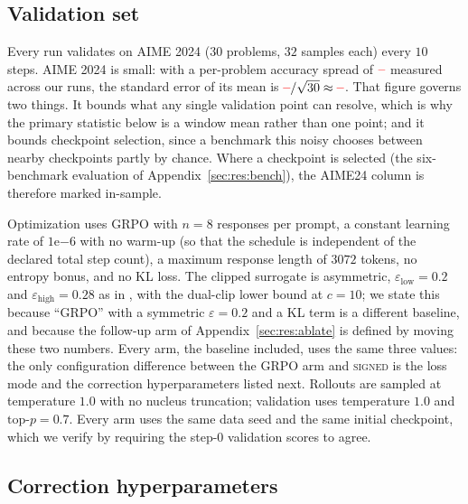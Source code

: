 \documentclass[11pt]{article}
\providecommand{\PENDING}{\textcolor{red}{\textbf{--}}}
\newcommand{\num}[1]{\ifcsname #1\endcsname\csname #1\endcsname\else\PENDING\fi}
\begin{document}
\subsection{Validation set}
\label{sec:valset}

Every run validates on AIME 2024 ($30$ problems, $32$ samples each) every $10$ steps.
AIME 2024 is small: with a per-problem accuracy spread of $\num{STDaime}$ measured
across our runs, the standard error of its mean is
$\num{STDaime}/\sqrt{30} \approx \num{SEaime}$. That figure governs two things.
It bounds what any single validation point can resolve, which is why the primary
statistic below is a window mean rather than one point; and it bounds checkpoint
selection, since a benchmark this noisy chooses between nearby checkpoints partly by
chance. Where a checkpoint is selected (the six-benchmark evaluation of
Appendix~\ref{sec:res:bench}), the AIME24 column is therefore marked in-sample.

Optimization uses GRPO \citep{shao2024deepseekmath} with $n = 8$ responses per prompt, a constant learning rate
of $1\mathrm{e}{-6}$ with no warm-up (so that the schedule is independent of the
declared total step count), a maximum response length of $3072$ tokens, no entropy
bonus, and no KL loss. The clipped surrogate \citep{schulman2017proximal} is
asymmetric, $\varepsilon_{\mathrm{low}} = 0.2$ and
$\varepsilon_{\mathrm{high}} = 0.28$ as in \citet{yu2025dapo}, with
the dual-clip lower bound at $c = 10$; we state this because ``GRPO'' with a
symmetric $\varepsilon = 0.2$ and a KL term is a different baseline, and because
the follow-up arm of Appendix~\ref{sec:res:ablate} is defined by moving these two
numbers. Every arm, the baseline included, uses the same three values: the
only configuration difference between the GRPO arm and \textsc{signed} is the loss mode and
the correction hyperparameters listed next. Rollouts are sampled at temperature $1.0$ with no nucleus
truncation; validation uses temperature $1.0$ and $\mathrm{top\text{-}}p = 0.7$.
Every arm uses the same data seed and the same initial checkpoint, which we verify by
requiring the step-$0$ validation scores to agree.

\subsection{Correction hyperparameters}
\end{document}

